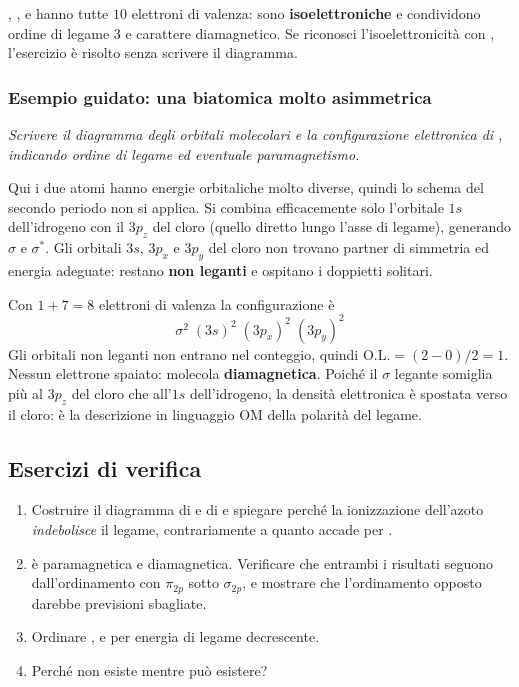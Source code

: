 \documentclass[11pt, a4paper, openright]{book}
\begin{document}
\noindent {}, ,  e  hanno tutte $10$ elettroni di valenza: sono
\textbf{isoelettroniche} e condividono ordine di legame $3$ e carattere diamagnetico. Se
riconosci l'isoelettronicità con , l'esercizio è risolto senza scrivere il diagramma.

\subsubsection{Esempio guidato: una biatomica molto asimmetrica}

\emph{Scrivere il diagramma degli orbitali molecolari e la configurazione elettronica di
, indicando ordine di legame ed eventuale paramagnetismo.}

\medskip
Qui i due atomi hanno energie orbitaliche molto diverse, quindi lo schema del secondo
periodo non si applica. Si combina efficacemente solo l'orbitale $1s$ dell'idrogeno con il
$3p_z$ del cloro (quello diretto lungo l'asse di legame), generando $\sigma$ e $\sigma^*$.
Gli orbitali $3s$, $3p_x$ e $3p_y$ del cloro non trovano partner di simmetria ed energia
adeguate: restano \textbf{non leganti} e ospitano i doppietti solitari.

Con $1 + 7 = 8$ elettroni di valenza la configurazione è
\begin{equation*}
  \sigma^2 \; (3s)^2 \; (3p_x)^2 \; (3p_y)^2
\end{equation*}
Gli orbitali non leganti non entrano nel conteggio, quindi
$\text{O.L.} = (2-0)/2 = 1$. Nessun elettrone spaiato: molecola \textbf{diamagnetica}.
Poiché il $\sigma$ legante somiglia più al $3p_z$ del cloro che all'$1s$ dell'idrogeno, la
densità elettronica è spostata verso il cloro: è la descrizione in linguaggio OM della
polarità del legame.

\subsection{Esercizi di verifica}

\begin{enumerate}
  \item Costruire il diagramma di  e di  e spiegare perché la ionizzazione
        dell'azoto \emph{indebolisce} il legame, contrariamente a quanto accade
        per .
  \item {} è paramagnetica e  diamagnetica. Verificare che entrambi i risultati
        seguono dall'ordinamento con $\pi_{2p}$ sotto $\sigma_{2p}$, e mostrare che
        l'ordinamento opposto darebbe previsioni sbagliate.
  \item Ordinare ,  e  per energia di legame decrescente.
  \item Perché  non esiste mentre  può esistere?
\end{enumerate}
\end{document}
